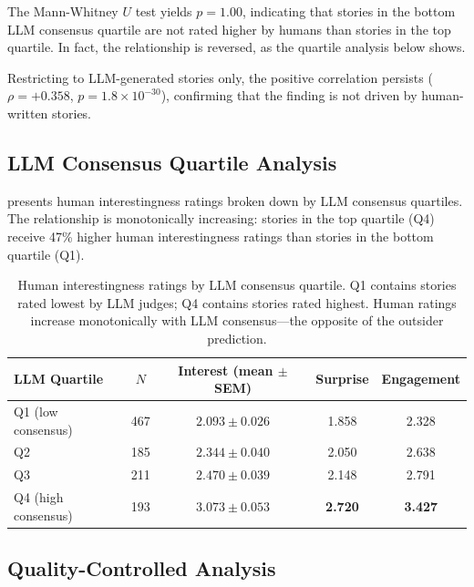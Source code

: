 The Mann-Whitney $U$ test yields $p = 1.00$, indicating that stories in the bottom LLM consensus quartile are not rated higher by humans than stories in the top quartile.
In fact, the relationship is reversed, as the quartile analysis below shows.

Restricting to LLM-generated stories only, the positive correlation persists ($\rho = +0.358$, $p = 1.8 \times 10^{-30}$), confirming that the finding is not driven by human-written stories.

\subsection{LLM Consensus Quartile Analysis}
\label{sec:quartiles}

 presents human interestingness ratings broken down by LLM consensus quartiles.
The relationship is monotonically increasing: stories in the top quartile (Q4) receive 47\% higher human interestingness ratings than stories in the bottom quartile (Q1).

\begin{table}[t]
    \centering
    \caption{Human interestingness ratings by LLM consensus quartile. Q1 contains stories rated lowest by LLM judges; Q4 contains stories rated highest. Human ratings increase monotonically with LLM consensus---the opposite of the outsider prediction.}
    \begin{tabular}{@{}lcccc@{}}
        \toprule
        \textbf{LLM Quartile} & \textbf{$N$} & \textbf{Interest (mean $\pm$ SEM)} & \textbf{Surprise} & \textbf{Engagement} \\
        \midrule
        Q1 (low consensus) & 467 & $2.093 \pm 0.026$ & 1.858 & 2.328 \\
        Q2 & 185 & $2.344 \pm 0.040$ & 2.050 & 2.638 \\
        Q3 & 211 & $2.470 \pm 0.039$ & 2.148 & 2.791 \\
        Q4 (high consensus) & 193 & $\mathbf{3.073 \pm 0.053}$ & \textbf{2.720} & \textbf{3.427} \\
        \bottomrule
    \end{tabular}
    \label{tab:quartiles}
\end{table}

\subsection{Quality-Controlled Analysis}
\label{sec:quality}

